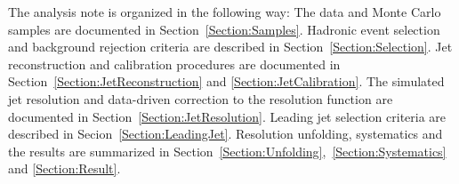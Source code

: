 The analysis note is organized in the following way: The data and Monte Carlo samples are documented in Section~\ref{Section:Samples}. Hadronic event selection and background rejection criteria are described in Section~\ref{Section:Selection}. Jet reconstruction and calibration procedures are documented in Section~\ref{Section:JetReconstruction} and \ref{Section:JetCalibration}. The simulated jet resolution and data-driven correction to the resolution function are documented in Section~\ref{Section:JetResolution}. Leading jet selection criteria are described in Secion~\ref{Section:LeadingJet}. Resolution unfolding, systematics and the results are summarized in Section~\ref{Section:Unfolding},~\ref{Section:Systematics} and \ref{Section:Result}.


\clearpage
